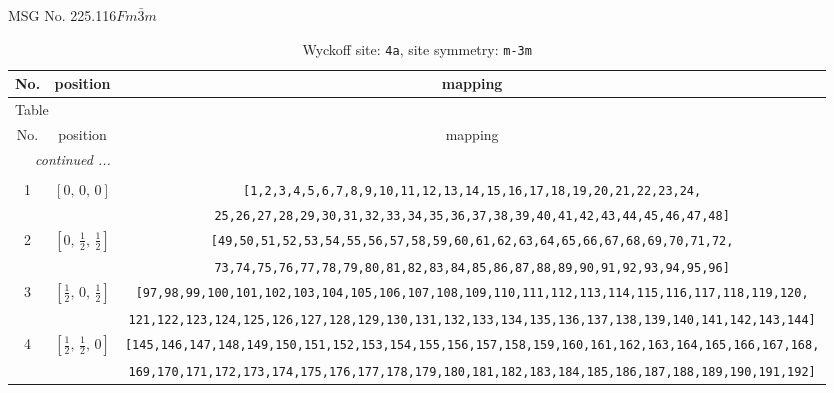 \documentclass[fleqn,8pt]{jsarticle}
\begin{document}
\setcounter{MaxMatrixCols}{32}

\renewcommand{\tablename}{Table~}
\renewcommand{\figurename}{Figure~}
\begin{center}
\LARGE
MSG No. 225.116\quad$Fm\bar{3}m$
\end{center}
\renewcommand{\arraystretch}{1.2}
\begin{longtable}{ccc}
\caption{Wyckoff site: {\tt 4a}, site symmetry: {\tt m-3m}}
 \\
 \hline \hline
No. & position & mapping \\ \hline \endfirsthead

\multicolumn{2}{l}{\tablename\ \thetable{}} \\
 \hline \hline
No. & position & mapping \\ \hline \endhead

 \hline \hline
\multicolumn{2}{r}{\footnotesize\it continued ...} \\ \endfoot

 \hline \hline
\multicolumn{2}{r}{} \\ \endlastfoot

1 & $\left[ 0,\, 0,\, 0 \right]$ & {\tt [1,2,3,4,5,6,7,8,9,10,11,12,13,14,15,16,17,18,19,20,21,22,23,24,} \\ \hline
 &  & {\tt 25,26,27,28,29,30,31,32,33,34,35,36,37,38,39,40,41,42,43,44,45,46,47,48]} \\ \hline
2 & $\left[ 0,\, \frac{1}{2},\, \frac{1}{2} \right]$ & {\tt [49,50,51,52,53,54,55,56,57,58,59,60,61,62,63,64,65,66,67,68,69,70,71,72,} \\ \hline
 &  & {\tt 73,74,75,76,77,78,79,80,81,82,83,84,85,86,87,88,89,90,91,92,93,94,95,96]} \\ \hline
3 & $\left[ \frac{1}{2},\, 0,\, \frac{1}{2} \right]$ & {\tt [97,98,99,100,101,102,103,104,105,106,107,108,109,110,111,112,113,114,115,116,117,118,119,120,} \\ \hline
 &  & {\tt 121,122,123,124,125,126,127,128,129,130,131,132,133,134,135,136,137,138,139,140,141,142,143,144]} \\ \hline
4 & $\left[ \frac{1}{2},\, \frac{1}{2},\, 0 \right]$ & {\tt [145,146,147,148,149,150,151,152,153,154,155,156,157,158,159,160,161,162,163,164,165,166,167,168,} \\ \hline
 &  & {\tt 169,170,171,172,173,174,175,176,177,178,179,180,181,182,183,184,185,186,187,188,189,190,191,192]} \\
\end{longtable}
\renewcommand{\arraystretch}{1.2}
\end{document}
